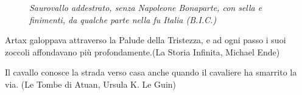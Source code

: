 \begin{figure}[h]
\begin{minipage}{0.45\textwidth}
\emph{Saurovallo addestrato, senza Napoleone Bonaparte, con sella e finimenti, da qualche parte nella fu Italia (B.I.C.)}
	\end{minipage}
\end{figure}

\bigskip

\begin{enfasi}
Artax galoppava attraverso la Palude della Tristezza, e ad ogni passo i suoi zoccoli affondavano più profondamente.(La Storia Infinita, Michael Ende)

\medskip

Il cavallo conosce la strada verso casa anche quando il cavaliere ha smarrito la via. (Le Tombe di Atuan, Ursula K. Le Guin)

\end{enfasi}


\pagebreak

